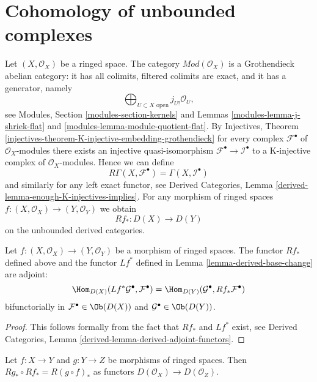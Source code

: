 \section{Cohomology of unbounded complexes}
\label{section-unbounded}

\noindent
Let $(X, \mathcal{O}_X)$ be a ringed space.
The category $\textit{Mod}(\mathcal{O}_X)$ is a Grothendieck
abelian category: it has all colimits,
filtered colimits are exact, and it has a generator, namely
$$
\bigoplus\nolimits_{U \subset X\text{ open}} j_{U!}\mathcal{O}_U,
$$
see Modules, Section \ref{modules-section-kernels} and
Lemmas \ref{modules-lemma-j-shriek-flat} and
\ref{modules-lemma-module-quotient-flat}.
By
Injectives, Theorem
\ref{injectives-theorem-K-injective-embedding-grothendieck}
for every complex $\mathcal{F}^\bullet$ of $\mathcal{O}_X$-modules
there exists an injective quasi-isomorphism
$\mathcal{F}^\bullet \to \mathcal{I}^\bullet$ to a K-injective complex
of $\mathcal{O}_X$-modules. Hence we can define
$$
R\Gamma(X, \mathcal{F}^\bullet) = \Gamma(X, \mathcal{I}^\bullet)
$$
and similarly for any left exact functor, see
Derived Categories, Lemma \ref{derived-lemma-enough-K-injectives-implies}.
For any morphism of
ringed spaces $f : (X, \mathcal{O}_X) \to (Y, \mathcal{O}_Y)$ we obtain
$$
Rf_* : D(X) \longrightarrow D(Y)
$$
on the unbounded derived categories.

\begin{lemma}
\label{lemma-adjoint}
Let $f : (X, \mathcal{O}_X) \to (Y, \mathcal{O}_Y)$ be a morphism of
ringed spaces. The functor $Rf_*$ defined above and the functor $Lf^*$
defined in Lemma \ref{lemma-derived-base-change} are adjoint:
$$
\Hom_{D(X)}(Lf^*\mathcal{G}^\bullet, \mathcal{F}^\bullet)
=
\Hom_{D(Y)}(\mathcal{G}^\bullet, Rf_*\mathcal{F}^\bullet)
$$
bifunctorially in $\mathcal{F}^\bullet \in \Ob(D(X))$ and
$\mathcal{G}^\bullet \in \Ob(D(Y))$.
\end{lemma}

\begin{proof}
This follows formally from the fact that $Rf_*$ and $Lf^*$ exist, see
Derived Categories, Lemma \ref{derived-lemma-derived-adjoint-functors}.
\end{proof}

\begin{lemma}
\label{lemma-derived-pushforward-composition}
Let $f : X \to Y$ and $g : Y \to Z$ be morphisms of ringed spaces.
Then $Rg_* \circ Rf_* = R(g \circ f)_*$ as functors
$D(\mathcal{O}_X) \to D(\mathcal{O}_Z)$.
\end{lemma}

